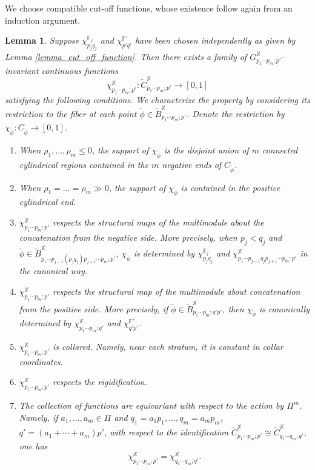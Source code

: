 \documentclass[reqno, 10pt]{amsart}
\numberwithin{equation}{section}
\numberwithin{equation}{section}
\newtheorem{lemma}[thm]{Lemma}
\theoremstyle{definition}
\theoremstyle{remark}
\newcommand{\beqn}{\begin{equation*}}
\newcommand{\eeqn}{\end{equation*}}
\newcommand{\mb}{\mathbb}
\newcommand{\wt}{\widetilde}
\begin{document}
We choose compatible cut-off functions, whose existence follow again from an induction argument.
\begin{lemma}
Suppose $\chi_{p_j q_j}^{\mb{F}_j}$ and $\chi_{p' q'}^{{\mb F}'}$ have been chosen independently as given by Lemma \ref{lemma_cut_off_function}. Then there exists a family of $G_{p_1 \cdots p_m; p'}^{\mb X}$-invariant continuous functions
\beqn
\chi_{p_1 \cdots p_m; p'}^{{\mb X}}: \wt C_{p_1 \cdots p_m; p'}^{{\mb X}} \to [0, 1]
\eeqn
satisfying the following conditions. We characterize the property by considering its restriction to the fiber at each point $\wt\phi \in \wt B_{p_1 \cdots p_m; p'}^{\mb X}$. Denote the restriction by $\chi_{\wt\phi}: C_{\wt\phi} \to [0, 1]$. 

\begin{enumerate}
    \item When $\rho_1, \ldots, \rho_m \leq 0$, the support of $\chi_{\wt\phi}$ is the disjoint union of $m$ connected cylindrical regions contained in the $m$ negative ends of $C_{\wt\phi}$.

    \item When $\rho_1= \ldots = \rho_m \gg 0$, the support of $\chi_{\wt\phi}$ is contained in the positive cylindrical end.

    \item $\chi_{p_1 \cdots p_m; p'}^{\mb X}$ respects the structural maps of the multimodule about the concatenation from the negative side. More precisely, when $p_j < q_j$ and $\wt\phi \in \wt B_{p_1 \cdots p_{j-1}(p_j q_j) p_{j+1} \cdots p_m; p'}^{\mb X}$, $\chi_{\wt\phi}$ is determined by $\chi_{p_j q_j}^{{\mb F}_j}$ and $\chi_{p_1 \cdots p_{j-1} q_j p_{j+1} \cdots p_m; p'}^{\mb X}$ in the canonical way.

    \item $\chi_{p_1 \cdots p_m; p'}^{\mb X}$ respects the structural map of the multimodule about concatenation from the positive side. More precisely, if $\wt\phi \in \wt B_{p_1 \cdots p_m; q'p'}^{\mb X}$, then $\chi_{\wt \phi}$ is canonically determined by $\chi_{p_1 \cdots p_m; q'}^{\mb X}$ and $\chi_{q'p'}^{{\mb F}'}$.
 
    \item $\chi_{p_1\cdots p_m; p'}^{\mb X}$ is collared. Namely, near each stratum, it is constant in collar coordinates.

    \item $\chi_{p_1 \cdots p_m; p'}^{\mb X}$ respects the rigidification. 

    \item The collection of functions are equivariant with respect to the action by $\Pi^m$. Namely, if $a_1, \ldots, a_m \in \Pi$ and $q_1 = a_1 p_1, \ldots, q_m = a_m p_m$, $q' = (a_1 + \cdots + a_m) p'$, with respect to the identification $\wt C_{p_1 \cdots p_m; p'}^{\mb X} \cong \wt C_{q_1 \cdots q_m; q'}^{\mb X}$, one has 
    \beqn
    \chi_{p_1 \cdots p_m; p'}^{\mb X} = \chi_{q_1 \cdots q_m; q'}^{\mb X}.
    \eeqn
    \end{enumerate}
\end{lemma}
\end{document}
